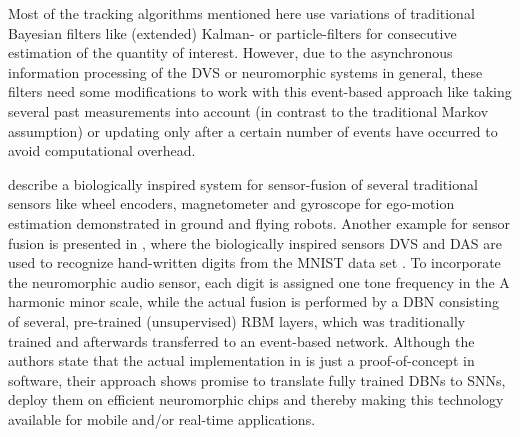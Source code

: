 Most of the tracking algorithms mentioned here use variations of traditional Bayesian filters like (extended) Kalman- or particle-filters \parencite{Thrun2005} for consecutive estimation of the quantity of interest.
However, due to the asynchronous information processing of the \ac{DVS} or neuromorphic systems in general, these filters need some modifications to work with this event-based approach \parencite{Weikersdorfer2013} like taking several past measurements into account (in contrast to the traditional Markov assumption) or updating only after a certain number of events have occurred to avoid computational overhead.

\textcite{Axenie2015} describe a biologically inspired system for sensor-fusion of several traditional sensors like wheel encoders, magnetometer and gyroscope for ego-motion estimation demonstrated in ground and flying robots.
Another example for sensor fusion is presented in \textcite{OConnor2013}, where the biologically inspired sensors \ac{DVS} and \ac{DAS} are used to recognize hand-written digits from the \ac{MNIST} data set \parencite{LeCun1998}.
To incorporate the neuromorphic audio sensor, each digit is assigned one tone frequency in the A harmonic minor scale, while the actual fusion is performed by a \ac{DBN} consisting of several, pre-trained (unsupervised) \ac{RBM} layers, which was traditionally trained and afterwards transferred to an event-based network.
Although the authors state that the actual implementation in \textcite{OConnor2013} is just a proof-of-concept in software, their approach shows promise to translate fully trained \acp{DBN} to \acp{SNN}, deploy them on efficient neuromorphic chips and thereby making this technology available for mobile and/or real-time applications.

